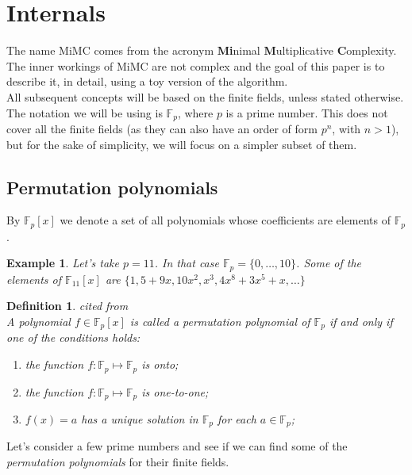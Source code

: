 \documentclass[letterpaper, bothsides, 12pt]{article} %
\newtheorem{definition}{Definition}
\newtheorem{example}{Example}
\begin{document}
\section{Internals}

The name MiMC comes from the acronym \textbf{Mi}nimal \textbf{M}ultiplicative \textbf{C}omplexity. 
The inner workings of MiMC are not complex and the goal of this paper is to describe it, in detail, using a toy version of the algorithm. \\

All subsequent concepts will be based on the finite fields, unless stated otherwise. \\
The notation we will be using is $\mathbb{F}_p$, where $p$ is a prime number. This does not cover all the finite fields (as they can also have an order of form $p^n$, with $n > 1$), but for the sake of simplicity, we will focus on a simpler subset of them. \\

\subsection{Permutation polynomials}

By $\mathbb{F}_p[x]$ we denote a set of all polynomials whose coefficients are elements of $\mathbb{F}_p$. 
\begin{example}
Let's take $p = 11$. In that case $\mathbb{F}_p = \{0, \dots, 10\}$. 
Some of the elements of $\mathbb{F}_{11}[x]$ are $\{ 1, 5+9x, 10x^2, x^3, 4x^8+3x^5+x, \dots \}$
\end{example}

\begin{definition} cited from \cite{zbMATH00967590} \\
A polynomial $f \in \mathbb{F}_p[x]$ is called a \textit{permutation polynomial} of $\mathbb{F}_p$ if and only if one of the conditions holds: 
    \begin{enumerate}
    \item the function $f\colon \mathbb{F}_p \mapsto \mathbb{F}_p $ is onto;
    \item the function $f\colon \mathbb{F}_p \mapsto \mathbb{F}_p $ is one-to-one;
    \item $f(x) = a$ has a unique solution in $\mathbb{F}_p$ for each $a \in \mathbb{F}_p$;
    \end{enumerate}
\end{definition} 

Let's consider a few prime numbers and see if we can find some of the \textit{permutation polynomials} for their finite fields. \\
\end{document}
